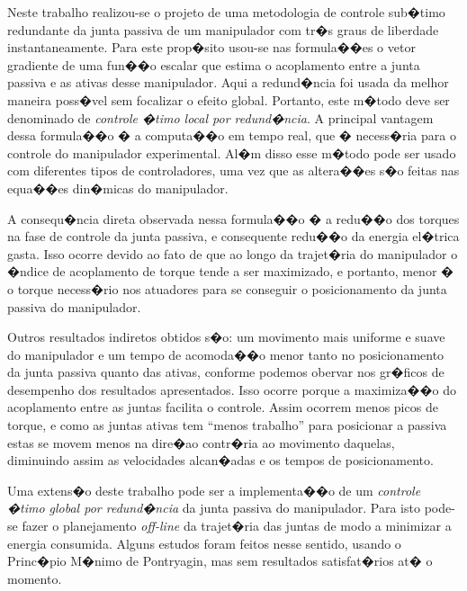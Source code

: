 
Neste trabalho realizou-se o projeto de uma metodologia de controle sub�timo redundante da junta passiva de um manipulador com tr�s graus de liberdade instantaneamente. Para este prop�sito usou-se nas formula��es o vetor gradiente de uma fun��o escalar que estima o acoplamento entre a junta passiva e as ativas desse manipulador. Aqui a redund�ncia
foi usada da melhor maneira poss�vel sem focalizar o efeito global. Portanto, este m�todo deve ser denominado de \emph{controle �timo local por redund�ncia}. A principal vantagem dessa formula��o � a computa��o em tempo real, que �
necess�ria para o controle do manipulador experimental. Al�m disso esse m�todo pode ser usado com diferentes tipos de controladores, uma vez que as altera��es s�o feitas nas equa��es din�micas do manipulador.

A consequ�ncia direta observada nessa formula��o � a redu��o dos torques na fase de controle da junta passiva, e consequente redu��o da energia el�trica gasta. Isso ocorre devido ao fato de que ao longo da trajet�ria do manipulador
o �ndice de acoplamento de torque tende a ser maximizado, e portanto, menor � o torque necess�rio nos atuadores para se conseguir o posicionamento da junta passiva do manipulador.

Outros resultados indiretos obtidos s�o: um movimento mais uniforme e suave do manipulador e um tempo de acomoda��o menor tanto no posicionamento da junta passiva quanto das ativas, conforme podemos obervar nos gr�ficos de desempenho dos resultados apresentados. Isso ocorre porque a maximiza��o do acoplamento entre as juntas facilita o controle. Assim
ocorrem menos picos de torque, e como as juntas ativas tem ``menos trabalho'' para posicionar a passiva estas se movem menos na dire�ao contr�ria ao movimento daquelas, diminuindo assim as velocidades alcan�adas e os tempos de posicionamento.

Uma extens�o deste trabalho pode ser a implementa��o de um \emph{controle �timo global por redund�ncia} da junta passiva do manipulador. Para isto pode-se fazer o planejamento \emph{off-line} da trajet�ria das juntas de modo a minimizar a energia consumida. Alguns estudos foram feitos nesse sentido, usando o Princ�pio M�nimo de Pontryagin, mas sem resultados satisfat�rios at� o momento.
